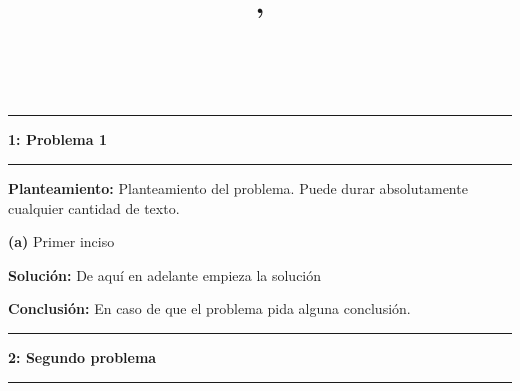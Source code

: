 \documentclass[11pt]{article}
\author{\textbf{\hmwkNombreAutor}\\ \textbf{ \vspace{0.1in}\hmwkAuthorID}}
\date{\hmwkFechaEntrega}
\title{
	\textbf{\hmwkUniversidad} \\
	\hmwkFacultad \\
	\vspace{0.1in}\hmwkSede\\
    \vspace{2.5in}
    \textmd{\textbf{\hmwkTitulo}}\\
    \vspace{0.1in}\large{\hmwkCurso , \textit{\hmwkCursoInstructor }}
    \vspace{2.5in}
}
\newcommand\problema[2]{\vspace{.12in}\hrule\textbf{#1: #2}\vspace{.5em}\hrule\vspace{.10in}}
\renewcommand\part[1]{\vspace{.10in}\textbf{(#1)}}
\newcommand\planteamiento{\vspace{.10in}\textbf{Planteamiento: }}
\newcommand\solucion{\vspace{.10in}\textbf{Solución: }}
\newcommand\conclusion{\vspace{.10in}\textbf{Conclusión: }}
\begin{document}
\maketitle
\pagebreak

\problema{1}{Problema 1}

\planteamiento Planteamiento del problema. Puede durar absolutamente cualquier cantidad de texto.

\part{a} Primer inciso

\solucion De aquí en adelante empieza la solución

\conclusion En caso de que el problema pida alguna conclusión.



\problema{2}{Segundo problema}
\end{document}
